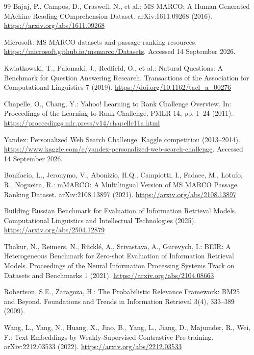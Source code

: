 \begin{thebibliography}{99}
Bajaj, P., Campos, D., Craswell, N., et al.: MS MARCO: A Human Generated MAchine Reading COmprehension Dataset. arXiv:1611.09268 (2016).
\url{https://arxiv.org/abs/1611.09268}

Microsoft: MS MARCO datasets and passage-ranking resources.
\url{https://microsoft.github.io/msmarco/Datasets}. Accessed 14 September 2026.

Kwiatkowski, T., Palomaki, J., Redfield, O., et al.: Natural Questions: A Benchmark for Question Answering Research. Transactions of the Association for Computational Linguistics 7 (2019).
\url{https://doi.org/10.1162/tacl_a_00276}

Chapelle, O., Chang, Y.: Yahoo! Learning to Rank Challenge Overview. In: Proceedings of the Learning to Rank Challenge. PMLR 14, pp. 1--24 (2011).
\url{https://proceedings.mlr.press/v14/chapelle11a.html}

Yandex: Personalized Web Search Challenge. Kaggle competition (2013--2014).
\url{https://www.kaggle.com/c/yandex-personalized-web-search-challenge}.
Accessed 14 September 2026.

Bonifacio, L., Jeronymo, V., Abonizio, H.Q., Campiotti, I., Fadaee, M., Lotufo, R., Nogueira, R.: mMARCO: A Multilingual Version of MS MARCO Passage Ranking Dataset. arXiv:2108.13897 (2021).
\url{https://arxiv.org/abs/2108.13897}

Building Russian Benchmark for Evaluation of Information Retrieval Models. Computational Linguistics and Intellectual Technologies (2025).
\url{https://arxiv.org/abs/2504.12879}

Thakur, N., Reimers, N., R\"uckl\'e, A., Srivastava, A., Gurevych, I.: BEIR: A Heterogeneous Benchmark for Zero-shot Evaluation of Information Retrieval Models. Proceedings of the Neural Information Processing Systems Track on Datasets and Benchmarks 1 (2021).
\url{https://arxiv.org/abs/2104.08663}

Robertson, S.E., Zaragoza, H.: The Probabilistic Relevance Framework: BM25 and Beyond. Foundations and Trends in Information Retrieval 3(4), 333--389 (2009).

Wang, L., Yang, N., Huang, X., Jiao, B., Yang, L., Jiang, D., Majumder, R., Wei, F.: Text Embeddings by Weakly-Supervised Contrastive Pre-training. arXiv:2212.03533 (2022).
\url{https://arxiv.org/abs/2212.03533}


\end{thebibliography}
